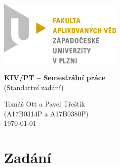 \documentclass[ 12pt, a4paper]{article}
\begin{document}
%
\centerline{\includegraphics[width=6cm]{zculogo.png}}
\vspace*{50px}
\begin{center}
{\LARGE\bf\noindent KIV/PT – Semestrální práce}\\
(Standartní zadání)
\vspace*{40px}  

Tomáš Ott a Pavel Třeštík \\
 (A17B0314P a A17B0380P)\\
\vspace*{\fill}  
\hspace*{\fill} \today \\
\end{center}
\newpage
\tableofcontents
\newpage
%
%
%
\section{Zadání}
\end{document}
